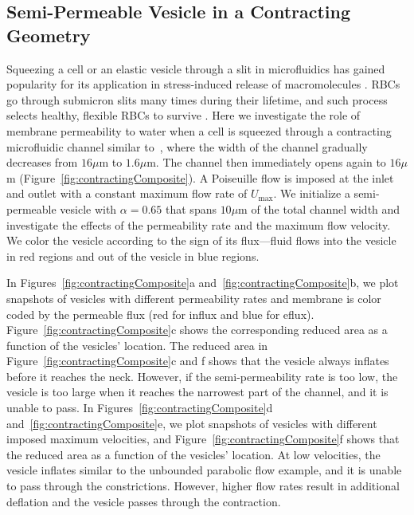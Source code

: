 \documentclass[9pt,twocolumn,twoside,lineno]{pnas-new}
\begin{document}
\subsection*{Semi-Permeable Vesicle in a Contracting Geometry} 
Squeezing a cell or an elastic vesicle through a slit in microfluidics has gained popularity for its application in stress-induced release of macromolecules
\cite{ShareiEtAl2013_PNAS,Pak2015_PNAS,ZhangShenHoganBarakatMisbah2018_BJ,LuoBai2019_PoF}. RBCs go through submicron slits many times during their lifetime, and such process selects healthy, flexible RBCs to survive \cite{wu2015critical,LuPeng2019_PoF}.
Here we investigate the role of membrane permeability to water when a cell is squeezed through a contracting microfluidic channel similar to~\cite{wu2015critical},
where the width of the channel gradually decreases from $16\mu$m to $1.6\mu$m. The channel then immediately opens
again to $16\mu$m (Figure~\ref{fig:contractingComposite}). A
Poiseuille flow is imposed at the inlet and outlet with a constant maximum flow
rate of $U_{\max}$. We initialize a semi-permeable vesicle with $\alpha
= 0.65$ that spans $10\mu$m of the total channel width and investigate
the effects of the permeability rate and the maximum flow velocity. We
color the vesicle according to the sign of its flux---fluid flows into
the vesicle in red regions and out of the vesicle in blue regions.

In Figures~\ref{fig:contractingComposite}a
and~\ref{fig:contractingComposite}b, we plot snapshots of vesicles with
different permeability rates and membrane is color coded by the permeable flux (red for influx and blue for eflux).
Figure~\ref{fig:contractingComposite}c
shows the corresponding reduced area as a function of the vesicles' location. 
The reduced area in Figure~\ref{fig:contractingComposite}c and f shows that the vesicle always inflates
before it reaches the neck.  However, if the
semi-permeability rate is too low, the vesicle is too large when it
reaches the narrowest part of the channel, and it is unable to pass. In
Figures~\ref{fig:contractingComposite}d
and~\ref{fig:contractingComposite}e, we plot snapshots of vesicles with
different imposed maximum velocities, and
Figure~\ref{fig:contractingComposite}f shows that the reduced area as a
function of the vesicles' location. At low velocities, the vesicle
inflates similar to the unbounded parabolic flow example, and it is
unable to pass through the constrictions. However, higher flow rates
result in additional deflation and the vesicle passes through the
contraction.
\end{document}
